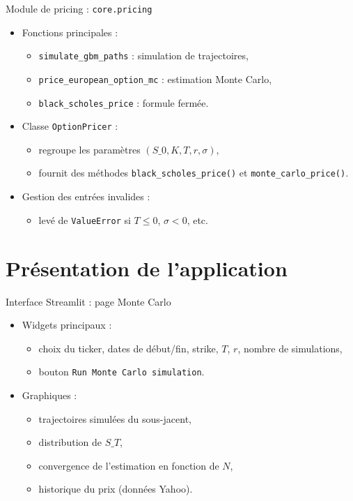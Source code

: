 \documentclass[aspectratio=169]{beamer}
\begin{document}
\begin{frame}{Module de pricing : \texttt{core.pricing}}
  \begin{itemize}
    \item Fonctions principales :
    \begin{itemize}
      \item \texttt{simulate\_gbm\_paths} : simulation de trajectoires,
      \item \texttt{price\_european\_option\_mc} : estimation Monte Carlo,
      \item \texttt{black\_scholes\_price} : formule ferm\'ee.
    \end{itemize}
    \item Classe \texttt{OptionPricer} :
    \begin{itemize}
      \item regroupe les param\`etres $(S\_0, K, T, r, \sigma)$,
      \item fournit des m\'ethodes \texttt{black\_scholes\_price()} et \texttt{monte\_carlo\_price()}.
    \end{itemize}
    \item Gestion des entr\'ees invalides :
    \begin{itemize}
      \item lev\'e de \texttt{ValueError} si $T \le 0$, $\sigma < 0$, etc.
    \end{itemize}
  \end{itemize}
\end{frame}

\section{Pr\'esentation de l'application}

\begin{frame}{Interface Streamlit : page Monte Carlo}
  \begin{itemize}
    \item Widgets principaux :
    \begin{itemize}
      \item choix du ticker, dates de d\'ebut/fin, strike, $T$, $r$, nombre de simulations,
      \item bouton \texttt{Run Monte Carlo simulation}.
    \end{itemize}
    \item Graphiques :
    \begin{itemize}
      \item trajectoires simul\'ees du sous-jacent,
      \item distribution de $S\_T$,
      \item convergence de l'estimation en fonction de $N$,
      \item historique du prix (donn\'ees Yahoo).
    \end{itemize}
  \end{itemize}
\end{frame}
\end{document}
